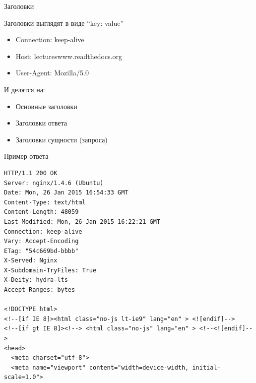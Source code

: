 \documentclass[c,unicode,russian]{beamer}
\begin{document}
\begin{frame}{Заголовки}

    Заголовки выглядят в виде ``key: value''

    \begin{itemize}
        \item Connection: keep-alive
        \item Host: lectureswww.readthedocs.org
        \item User-Agent: Mozilla/5.0
    \end{itemize}

    И делятся на:

    \begin{itemize}
        \item Основные заголовки
        \item Заголовки ответа
        \item Заголовки сущности (запроса)
    \end{itemize}


\end{frame}

\begin{frame}[fragile]{Пример ответа}
    \begin{Verbatim}[fontsize=\tiny]
HTTP/1.1 200 OK
Server: nginx/1.4.6 (Ubuntu)
Date: Mon, 26 Jan 2015 16:54:33 GMT
Content-Type: text/html
Content-Length: 48059
Last-Modified: Mon, 26 Jan 2015 16:22:21 GMT
Connection: keep-alive
Vary: Accept-Encoding
ETag: "54c669bd-bbbb"
X-Served: Nginx
X-Subdomain-TryFiles: True
X-Deity: hydra-lts
Accept-Ranges: bytes

<!DOCTYPE html>
<!--[if IE 8]><html class="no-js lt-ie9" lang="en" > <![endif]-->
<!--[if gt IE 8]><!--> <html class="no-js" lang="en" > <!--<![endif]-->
<head>
  <meta charset="utf-8">
  <meta name="viewport" content="width=device-width, initial-scale=1.0">
    \end{Verbatim}
\end{frame}
\end{document}
